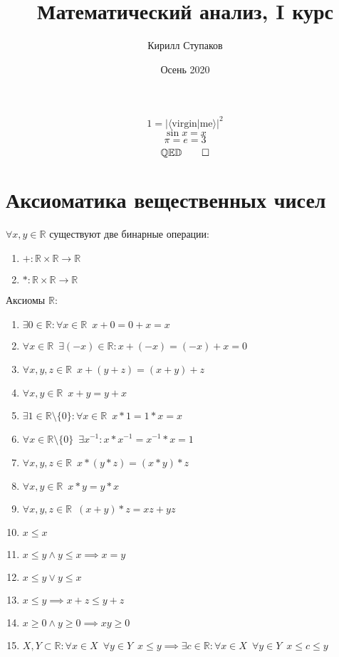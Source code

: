 \documentclass[11pt, a4paper, utf-8]{article}
\title{Математический анализ, I курс}
\author{Кирилл Ступаков}
\date{Осень 2020}
\def\R{\mathbb{R}}
\def\sp{\, \, \,}
\begin{document}
    \maketitle \pagebreak
    \tableofcontents \pagebreak

    $$1 = |\langle \text{virgin} | \text{me} \rangle |^2$$
    $$\sin x = x$$
    $$\pi = e = 3$$
    $$\mathbb{QED} \qed$$

    \section{Аксиоматика вещественных чисел}
    $\forall x,y \in \R$ существуют две бинарные операции:
    \begin{enumerate}
        \item $+: \R \times \R \to \R$
        \item $*: \R \times \R \to \R$
    \end{enumerate}

    Аксиомы $\R$:
    \begin{enumerate}
        \item $\exists 0 \in \R : \forall x \in \R \sp x + 0 = 0 + x = x$
        \item $\forall x \in \R \sp \exists (-x) \in \R: x + (-x) = (-x) + x = 0$
        \item $\forall x,y,z \in \R \sp x+(y+z)=(x+y)+z$
        \item $\forall x,y \in \R \sp x+y = y+x$
        \item $\exists 1 \in \R \setminus \{0\}: \forall x \in \R \sp x*1 = 1*x = x$
        \item $\forall x \in \R \setminus \{0\} \sp \exists x^{-1}: x*x^{-1} = x^{-1}*x = 1$
        \item $\forall x,y,z \in \R \sp x*(y*z)=(x*y)*z$
        \item $\forall x,y \in \R \sp x*y = y*x$
        \item $\forall x,y,z \in \R \sp (x+y)*z=xz + yz$
        \item $x \leq x$
        \item $x \leq y \land y \leq x \implies x = y$
        \item $x \leq y \lor y \leq x$
        \item $x \leq y \implies x+z \leq y+z$
        \item $x \geq 0 \land y \geq 0 \implies xy \geq 0$
        \item $X, Y \subset \R: \forall x \in X \sp \forall y \in Y \sp x \leq y \implies \exists c \in \R: \forall x \in X \sp \forall y \in Y \sp x \leq c \leq y$
    \end{enumerate}
\end{document}
